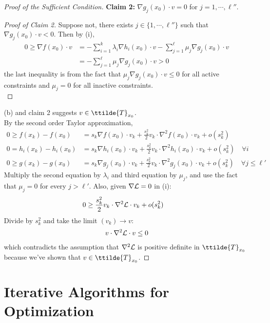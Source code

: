 \documentclass{article}
\begin{document}
\begin{proof}[Proof of the Sufficient Condition]
		\textbf{Claim 2:} $\nabla g_j(x_0) \cdot v = 0$ for $j = 1, \cdots, \ell''$.
		\begin{proof}[Proof of Claim 2]
			Suppose not, there exists $j \in \{1, \cdots, \ell''\}$ such that $\nabla g_j(x_0) \cdot v < 0$. Then by (i),
			\begin{align}
				0 \geq \nabla f(x_0) \cdot v &= - \sum_{i=1}^k \lambda_i \nabla h_i(x_0) \cdot v - \sum_{j=1}^{\ell} \mu_j \nabla g_j(x_0) \cdot v \\
				&= - \sum_{j=1}^{\ell} \mu_j \nabla g_j(x_0) \cdot v > 0
			\end{align}
			the last inequality is from the fact that $\mu_j \nabla g_j (x_0) \cdot v \leq 0$ for all active constraints and $\mu_j = 0$ for all inactive constraints. \\
		\end{proof}
		(b) and claim 2 suggests $v \in \ttilde{T}_{x_0}$. \\
		By the second order Taylor approximation,
		\begin{align}
			0 \geq f(x_k) - f(x_0) &= s_k \nabla f(x_0)\cdot v_k + \frac{s_k^2}{2} v_k \cdot \nabla^2 f(x_0) \cdot v_k + o(s_k^2) \\
			0 = h_i(x_k) - h_i(x_0) &= s_k \nabla h_i(x_0)\cdot v_k + \frac{s_k^2}{2} v_k \cdot \nabla^2 h_i(x_0) \cdot v_k + o(s_k^2)\quad \forall i\\
			0 \geq g(x_k) - g(x_0) &= s_k \nabla g_j(x_0)\cdot v_k + \frac{s_k^2}{2} v_k \cdot \nabla^2 g_j(x_0) \cdot v_k + o(s_k^2)\quad \forall j \leq \ell'
		\end{align}
		Multiply the second equation by $\lambda_i$ and third equation by $\mu_j$, and use the fact that $\mu_j = 0$ for every $j > \ell'$. Also, given $\nabla \mathcal{{L}} = 0$ in (i): 
		\begin{align}
			0 &\geq \frac{s_k^2}{2} v_k \cdot \nabla^2 \mathcal{{L}} \cdot v_k + o(s_k^2)
		\end{align}
		Divide by $s_k^2$ and take the limit $(v_k) \to v$:
		\begin{align}
			v\cdot \nabla^2 \mathcal{{L}}\cdot v \leq 0
		\end{align}
		which contradicts the assumption that $\nabla^2 \mathcal{{L}}$ is positive definite in $\ttilde{T}_{x_0}$ because we've shown that $v \in \ttilde{T}_{x_0}$.
	\end{proof}
	\section{Iterative Algorithms for Optimization}
\end{document}
